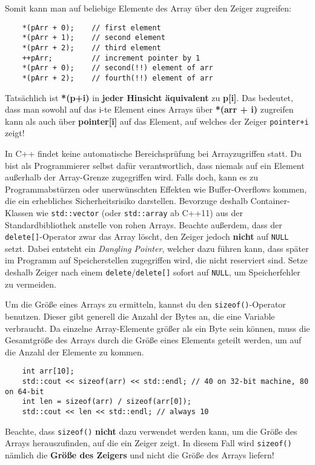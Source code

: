 Somit kann man auf beliebige Elemente des Array über den Zeiger zugreifen:

\begin{lstlisting}
	*(pArr + 0);	// first element
	*(pArr + 1);	// second element
	*(pArr + 2);	// third element
	++pArr;			// increment pointer by 1
	*(pArr + 0);	// second(!!) element of arr
	*(pArr + 2);	// fourth(!!) element of arr
\end{lstlisting}

Tatsächlich ist \textbf{*(p+i)} in \textbf{jeder Hinsicht äquivalent} zu \textbf{p[i]}.
Das bedeutet, dass man sowohl auf das i-te Element eines Arrays über \textbf{*(arr + i)} zugreifen kann als auch über \textbf{pointer[i]} auf das Element, auf welches der Zeiger \texttt{pointer+i} zeigt!

In C++ findet keine automatische Bereichsprüfung bei Arrayzugriffen statt.
Du bist als Programmierer selbst dafür verantwortlich, dass niemals auf ein Element außerhalb der Array-Grenze zugegriffen wird.
Falls doch, kann es zu Programmabstürzen oder unerwünschten Effekten wie  Buffer-Overflows kommen, die ein erhebliches Sicherheitsrisiko darstellen.
Bevorzuge deshalb Container-Klassen wie \texttt{std::vector} (oder \texttt{std::array} ab C++11) aus der Standardbibliothek anstelle von \glqq rohen\grqq{} Arrays.
Beachte außerdem, dass der \texttt{delete[]}-Operator zwar das Array löscht, den Zeiger jedoch \textbf{nicht} auf \texttt{NULL} setzt.
Dabei entsteht ein \emph{Dangling Pointer}, welcher dazu führen kann, dass später im Programm auf Speicherstellen zugegriffen wird, die nicht reserviert sind.
Setze deshalb Zeiger nach einem \texttt{delete}/\texttt{delete[]} sofort auf \texttt{NULL}, um Speicherfehler zu vermeiden.

Um die Größe eines Arrays zu ermitteln, kannst du den \texttt{sizeof()}-Operator benutzen.
Dieser gibt generell die Anzahl der Bytes an, die eine Variable verbraucht.
Da einzelne Array-Elemente größer als ein Byte sein können, muss die Gesamtgröße des Arrays durch die Größe eines Elements geteilt werden, um auf die Anzahl der Elemente zu kommen.

\begin{lstlisting}
	int arr[10];
	std::cout << sizeof(arr) << std::endl; // 40 on 32-bit machine, 80 on 64-bit
	int len = sizeof(arr) / sizeof(arr[0]);
	std::cout << len << std::endl; // always 10
\end{lstlisting}

Beachte, dass \texttt{sizeof()} \textbf{nicht} dazu verwendet werden kann, um die Größe des Arrays herauszufinden, auf die ein Zeiger zeigt.
In diesem Fall wird \texttt{sizeof()} nämlich die \textbf{Größe des Zeigers} und nicht die Größe des Arrays liefern!

